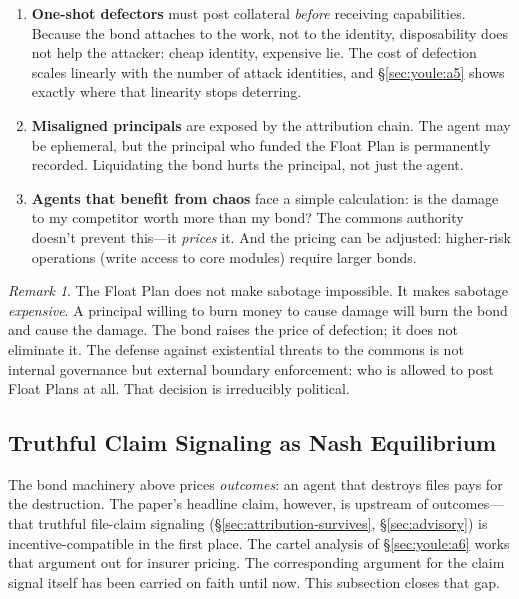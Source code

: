 \documentclass[11pt,a4paper]{article}
\theoremstyle{definition}
\theoremstyle{remark}
\newtheorem*{remark}{Remark}
\begin{document}
\begin{enumerate}
  \item \textbf{One-shot defectors} must post collateral \emph{before} receiving capabilities. Because the bond attaches to the work, not to the identity, disposability does not help the attacker: cheap identity, expensive lie. The cost of defection scales linearly with the number of attack identities, and \S\ref{sec:youle:a5} shows exactly where that linearity stops deterring.

  \item \textbf{Misaligned principals} are exposed by the attribution chain. The agent may be ephemeral, but the principal who funded the Float Plan is permanently recorded. Liquidating the bond hurts the principal, not just the agent.

  \item \textbf{Agents that benefit from chaos} face a simple calculation: is the damage to my competitor worth more than my bond? The commons authority doesn't prevent this---it \emph{prices} it. And the pricing can be adjusted: higher-risk operations (write access to core modules) require larger bonds.
\end{enumerate}

\begin{remark}
The Float Plan does not make sabotage impossible. It makes sabotage \emph{expensive}. A principal willing to burn money to cause damage will burn the bond and cause the damage. The bond raises the price of defection; it does not eliminate it. The defense against existential threats to the commons is not internal governance but external boundary enforcement: who is allowed to post Float Plans at all. That decision is irreducibly political.
\end{remark}

\subsection{Truthful Claim Signaling as Nash Equilibrium}\label{sec:claim-signaling-ic}

The bond machinery above prices \emph{outcomes}: an agent that destroys files pays for the destruction. The paper's headline claim, however, is upstream of outcomes---that truthful file-claim signaling (\S\ref{sec:attribution-survives}, \S\ref{sec:advisory}) is incentive-compatible in the first place. The cartel analysis of \S\ref{sec:youle:a6} works that argument out for insurer pricing. The corresponding argument for the claim signal itself has been carried on faith until now. This subsection closes that gap.
\end{document}
